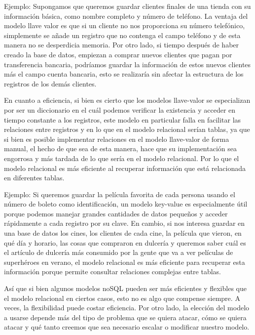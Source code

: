 \documentclass[12pt]{report}
\begin{document}
\begin{enumerate}[label=\textbf{\arabic*.}, leftmargin=*]
\begin{enumerate}[label=\textbf{\alph*.}, leftmargin=*, itemsep=1.0em]
\begin{itemize}
    Ejemplo: Supongamos que queremos guardar clientes finales de una tienda con su información básica, como nombre completo y número de teléfono.
    La ventaja del modelo llave valor es que si un cliente no nos proporciona su número telefónico, simplemente se añade un registro que no contenga el campo teléfono y de esta manera no se desperdicia memoria.
    Por otro lado, si tiempo después de haber creado la base de datos, empiezan a comprar nuevos clientes que pagan por transferencia bancaria, podríamos guardar la información de estos nuevos clientes más el campo cuenta bancaria, esto se realizaría sin afectar la estructura de los registros de los demás clientes.

    En cuanto a eficiencia, si bien es cierto que los modelos llave-valor se especializan por ser un diccionario en el cuál podemos verificar la existencia y acceder en tiempo constante a los registros, este modelo en particular falla en facilitar las relaciones entre registros y en lo que en el modelo relacional serían tablas, ya que si bien es posible implementar relaciones en el modelo llave-valor de forma manual, el hecho de que sea de esta manera, hace que su implementación sea engorrosa y más tardada de lo que sería en el modelo relacional. Por lo que el modelo relacional es más eficiente al recuperar información que está relacionada en diferentes tablas.

    Ejemplo: Si queremos guardar la película favorita de cada persona usando el número de boleto como identificación, un modelo key-value es especialmente útil porque podemos manejar grandes cantidades de datos pequeños y acceder rápidamente a cada registro por su clave.
    En cambio, si nos interesa guardar en una base de datos los cines, los clientes de cada cine, la película que vieron, en qué día y horario, las cosas que compraron en dulcería y queremos saber cuál es el artículo de dulcería más consumido por la gente que va a ver películas de superhéroes en verano, el modelo relacional es más eficiente para recuperar esta información porque permite consultar relaciones complejas entre tablas.

    Así que si bien algunos modelos noSQL pueden ser más eficientes y flexibles que el modelo relacional en ciertos casos, esto no es algo que compense siempre. A veces, la flexibilidad puede costar eficiencia.
    Por otro lado, la elección del modelo a usarse depende más del tipo de problema que se quiera atacar, cómo se quiera atacar y qué tanto creemos que sea necesario escalar o modificar nuestro modelo.


\end{itemize}
\end{enumerate}
\end{enumerate}
\end{document}

